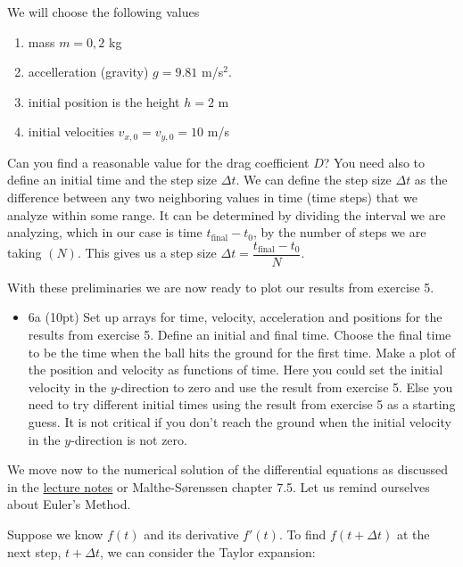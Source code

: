 \documentclass[%
oneside,                 %
final,                   %
10pt]{article}
\begin{document}
We will choose the following values
\begin{enumerate}
\item mass $m=0,2$ kg

\item accelleration (gravity) $g=9.81$ m/s$^{2}$.

\item initial position is the height $h=2$ m

\item initial velocities $v_{x,0}=v_{y,0}=10$ m/s
\end{enumerate}

\noindent
Can you find a reasonable value for the drag coefficient $D$?
You need also to define an initial time and 
the step size $\Delta t$. We can define the step size $\Delta t$ as the difference between any
two neighboring values in time (time steps) that we analyze within
some range. It can be determined by dividing the interval we are
analyzing, which in our case is time $t_{\mathrm{final}}-t_0$, by the number of steps we
are taking $(N)$. This gives us a step size $\Delta t = \dfrac{t_{\mathrm{final}}-t_0}{N}$.

With these preliminaries we are now ready to plot our results from exercise 5.

\begin{itemize}
\item 6a (10pt) Set up arrays for time, velocity, acceleration and positions for the results from exercise 5. Define an initial and final time. Choose the final time to be the time when the ball hits the ground for the first time. Make a plot of the position and velocity as functions of time.  Here you could set the initial velocity in the $y$-direction to zero and use the result from exercise 5. Else you need to try different initial times using the result from exercise 5 as a starting guess.  It is not critical if you don't reach the ground when the initial velocity in the $y$-direction is not zero.
\end{itemize}

\noindent
We move now to the numerical solution of the differential equations as discussed in the \href{{https://mhjensen.github.io/Physics321/doc/pub/motion/html/motion.html}}{lecture notes} or Malthe-Sørenssen chapter 7.5.
Let us remind ourselves about  Euler's Method.

Suppose we know $f(t)$ and its derivative $f'(t)$. To find $f(t+\Delta t)$ at the next step, $t+\Delta t$,
we can consider the Taylor expansion:
\end{document}
